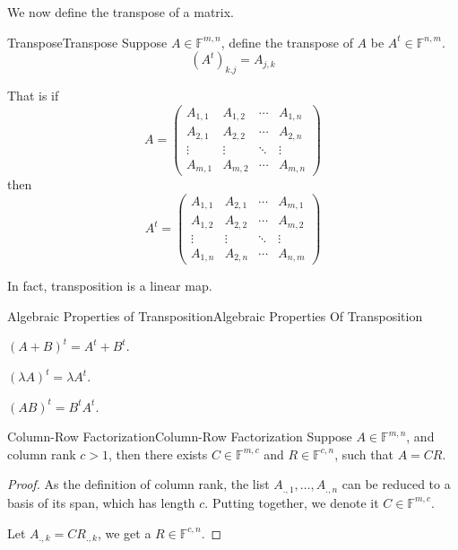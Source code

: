\documentclass[../main.tex]{subfiles}
\begin{document}
We now define the transpose of a matrix.

\begin{definition}{Transpose}{Transpose}
Suppose $A\in \mathbb{F}^{m,n}$, define the transpose of $A$ be $A^t\in \mathbb{F}^{n,m}$.
\begin{equation*}
	(A^t)_{k.j} = A_{j,k}
\end{equation*}
\end{definition}

That is if
\begin{equation*}
A = 
\begin{pmatrix}
A_{1,1} & A_{1,2} & \cdots & A_{1,n}\\
A_{2,1} & A_{2,2} & \cdots & A_{2,n}\\
\vdots & \vdots & \ddots & \vdots \\
A_{m,1} & A_{m,2} & \cdots & A_{m,n}
\end{pmatrix}
\end{equation*}
then
\begin{equation*}
A^t=
\begin{pmatrix}
A_{1,1} & A_{2,1} & \cdots & A_{m,1}\\
A_{1,2} & A_{2,2} & \cdots & A_{m,2}\\
\vdots & \vdots & \ddots & \vdots \\
A_{1,n} & A_{2,n} & \cdots & A_{n,m}
\end{pmatrix}
\end{equation*}
\begin{remark}
In fact, transposition is a linear map.
\end{remark}

\begin{theorem}{Algebraic Properties of Transposition}{Algebraic Properties Of Transposition}
\item $(A+B)^t = A^t+B^t$.
\item $(\lambda A)^t = \lambda A^t$.
\item $(AB)^t = B^tA^t$.
\end{theorem}

\begin{theorem}{Column-Row Factorization}{Column-Row Factorization}
Suppose $A\in \mathbb{F}^{m,n}$, and column rank $c>1$, then there exists $C\in \mathbb{F}^{m,c}$ and $R\in \mathbb{F}^{c,n}$, such that $A=CR$.
\end{theorem}
\begin{proof}
As the definition of column rank, the list $A_{.,1}, \ldots ,A_{.,n}$ can be reduced to a basis of its span, which has length $c$. Putting together, we denote it $C\in \mathbb{F}^{m,c}$.

Let $A_{.,k} = C R_{.,k}$, we get a $R\in \mathbb{F}^{c,n}$.
\end{proof}
\end{document}
